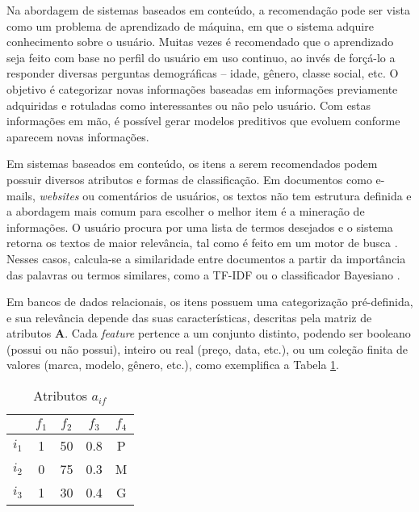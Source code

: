 Na abordagem de sistemas baseados em conteúdo, a recomendação pode ser vista como um problema de aprendizado de máquina, em que o sistema adquire conhecimento sobre o usuário. Muitas vezes é recomendado que o aprendizado seja feito com base no perfil do usuário em uso continuo, ao invés de forçá-lo a responder diversas perguntas demográficas \cite{wei2007survey} -- idade, gênero, classe social, etc. O objetivo é categorizar novas informações baseadas em informações previamente adquiridas e rotuladas como interessantes ou não pelo usuário. Com estas informações em mão, é possível gerar modelos preditivos que evoluem conforme aparecem novas informações.

Em sistemas baseados em conteúdo, os itens a serem recomendados podem possuir diversos atributos e formas de classificação. Em documentos como e-mails, \textit{websites} ou comentários de usuários, os textos não tem estrutura definida e a abordagem mais comum para escolher o melhor item é a mineração de informações. O usuário procura por uma lista de termos desejados e o sistema retorna os textos de maior relevância, tal como é feito em um motor de busca \cite{schafer2001commerce}. Nesses casos, calcula-se a similaridade entre documentos a partir da importância das palavras ou termos similares, como a TF-IDF ou o classificador Bayesiano \cite{lops2011content-chap3}. 

Em bancos de dados relacionais, os itens possuem uma categorização pré-definida, e sua relevância depende das suas características, descritas pela matriz de atributos $\mathbf{A}$. Cada \textit{feature} pertence a um conjunto distinto, podendo ser booleano (possui ou não possui), inteiro ou real (preço, data, etc.), ou um coleção finita de valores (marca, modelo, gênero, etc.), como exemplifica a Tabela \ref{tab:aif}.

\begin{table}[h]
\begin{center}
    \caption{Atributos $a_{if}$}
    \label{tab:aif}
    \begin{tabular}{ | c | c | c | c | c | } 
    \hline
     & $f_1$ & $f_2$ & $f_3$ & $f_4$ \\ \hline
     $i_1$ & 1 & 50 & 0.8 & P \\ \hline
     $i_2$ & 0 & 75 & 0.3 & M \\ \hline
     $i_3$ & 1 & 30 & 0.4 & G \\ \hline
    \end{tabular}
\end{center}
\end{table}

